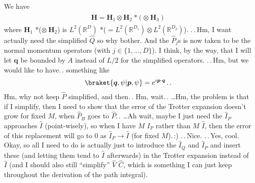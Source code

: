 \documentclass{report}
\begin{document}
We have
\begin{align}
\begin{aligned}
	\textbf{H} = \textbf{H}_{1} \otimes \textbf{H}_{2}\ \mathrm{*}(\otimes\ \textbf{H}_3)
\end{aligned}
\end{align} 
where $\textbf{H}_{1}$ *($\otimes\ \textbf{H}_{2}$) is $L^2(\mathbb{R}^D)$ *($= L^2(\mathbb{R}^{D_1}) \otimes L^2(\mathbb{R}^{D_2})$). .\,.\,Hm, I want actually need the simplified $\hat Q$ so why bother. And the $\hat P_j$s is now taken to be the normal momentum operators (with $j\in\{1, \ldots, D\}$). I think, by the way, that I will let $\boldsymbol{q}$ be bounded by $A$ instead of $L/2$ for the simplified operators. .\,.\,Hm, but we would like to have.\,. something like
\begin{align}
\begin{aligned}
	\braket{\boldsymbol{q}, \psi | \boldsymbol{p}, \psi} =
		e^{i \boldsymbol{p} \cdot \boldsymbol{q}} \,.\,. 
\end{aligned}
\end{align} 
Hm, why not keep $\hat P$ simplified, and then.\,. Hm, wait.\,. \ldots Hm, the problem is that if I simplify, then I need to show that the error of the Trotter expansion doesn't grow for fixed $M$, when $\hat P_B$ goes to $\hat P$.\,. \ldots Ah wait, maybe I just need the $\hat I_P$ approaches $\hat I$ (point-wisely), so when I have $M$ $\hat I_P$ rather than $M$ $\hat I$, then the error of this replacement will go to 0 as $\hat I_P \to \hat I$ (for fixed $M$).\,:) .\,.\,Nice. .\,.\,Yes, cool. Okay, so all I need to do is actually just to introduce the $\hat I_Q$ and $\hat I_P$ and insert these (and letting them tend to $\hat I$ afterwards) in the Trotter expansion instead of $\hat I$ (and I should also still ``simplify'' $\hat V$ $\hat C$, which is something I can just keep throughout the derivation of the path integral).  
\end{document}
